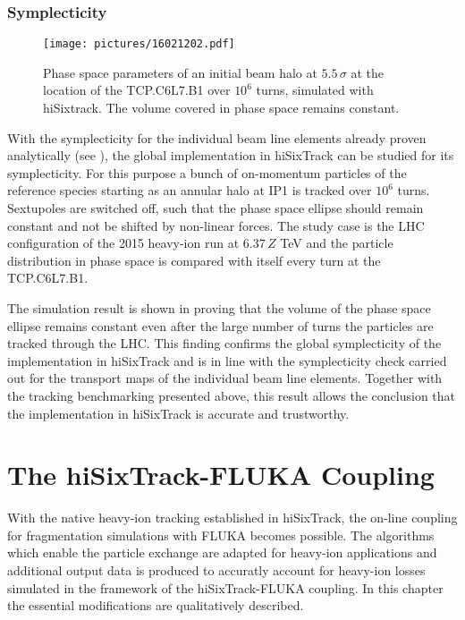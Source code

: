 \subsubsection{Symplecticity}

\begin{figure}[t]  
    \centering
    \texttt{[image: pictures/16021202.pdf]}
    \caption{Phase space parameters of an initial beam halo at $5.5\,\sigma$ at the location of the TCP.C6L7.B1 over $10^6$ turns, simulated with hiSixtrack. The volume covered in phase space remains constant.}  
    \label{pic:16021201}
\end{figure}

With the symplecticity for the individual beam line elements already proven analytically (see ), the global implementation in hiSixTrack can be studied for its symplecticity. For this purpose a bunch of on-momentum particles of the reference species starting as an annular halo at IP1 is tracked over $10^6$ turns. Sextupoles are switched off, such that the phase space ellipse should remain constant and not be shifted by non-linear forces. The study case is the LHC configuration of the 2015 heavy-ion run at $6.37\,Z$ TeV and the particle distribution in phase space is compared with itself every turn at the TCP.C6L7.B1.

The simulation result is shown in  proving that the volume of the phase space ellipse remains constant even after the large number of turns the particles are tracked through the LHC. This finding confirms the global symplecticity of the implementation in hiSixTrack and is in line with the symplecticity check carried out for the transport maps of the individual beam line elements. Together with the tracking benchmarking presented above, this result allows the conclusion that the implementation in hiSixTrack is accurate and trustworthy.  







\section{The hiSixTrack-FLUKA Coupling} \label{chap:hisix_coupling}

With the native heavy-ion tracking established in hiSixTrack, the on-line coupling for fragmentation simulations with FLUKA becomes possible. The algorithms which enable the particle exchange are adapted for heavy-ion applications and additional output data is produced to accuratly account for heavy-ion losses simulated in the framework of the hiSixTrack-FLUKA coupling. In this chapter the essential modifications are qualitatively described. 

